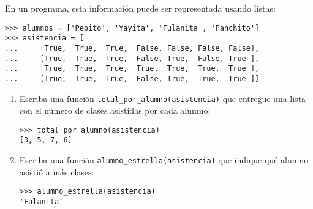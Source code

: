 \documentclass[10pt,spanish]{article}
\begin{document}
\begin{enumerate}
      En un programa,
      esta información puede ser representada
      usando listas:
      \begin{lstlisting}
>>> alumnos = ['Pepito', 'Yayita', 'Fulanita', 'Panchito']
>>> asistencia = [
...     [True,  True,  True,  False, False, False, False],
...     [True,  True,  True,  False, True,  False, True ],
...     [True,  True,  True,  True,  True,  True,  True ],
...     [True,  True,  True,  False, True,  True,  True ]]
      \end{lstlisting}

      \begin{enumerate}
        \item
          Escriba una función \lstinline+total_por_alumno(asistencia)+
          que entregue una lista
          con el número de clases asistidas por cada alumno:
          \begin{lstlisting}
>>> total_por_alumno(asistencia)
[3, 5, 7, 6]
          \end{lstlisting}
        \item
          Escriba una función \lstinline+alumno_estrella(asistencia)+
          que indique qué alumno asistió a más clases:
          \begin{lstlisting}
>>> alumno_estrella(asistencia)
'Fulanita'
          \end{lstlisting}
      \end{enumerate}
      \framebox[\textwidth]{\rule[55.0ex]{0pt}{0pt}}

  \end{enumerate}
\end{document}
